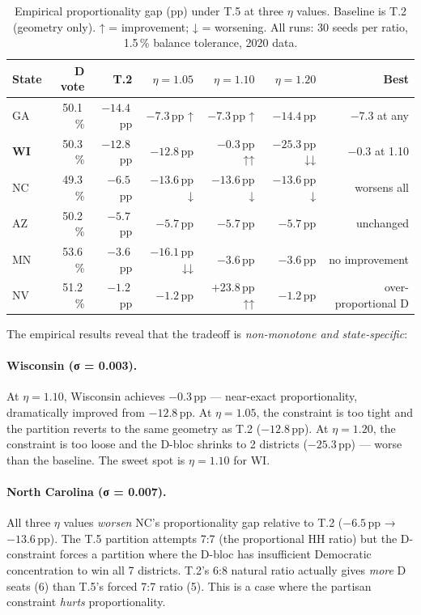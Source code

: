 \begin{table}[h]
\centering
\caption{Empirical proportionality gap (pp) under T.5 at three $\eta$ values.
Baseline is T.2 (geometry only). ↑ = improvement; ↓ = worsening.
All runs: 30 seeds per ratio, 1.5\,\% balance tolerance, 2020 data.}
\label{tab:tradeoff-empirical}
\begin{tabular}{lrrrrrr}
\toprule
State & D vote & T.2 & $\eta=1.05$ & $\eta=1.10$ & $\eta=1.20$ & Best \\
\midrule
GA & 50.1\,\% & $-14.4$\,pp & $-7.3$\,pp \small{↑} & $-7.3$\,pp \small{↑} & $-14.4$\,pp & $-7.3$ at any \\
\textbf{WI} & 50.3\,\% & $-12.8$\,pp & $-12.8$\,pp & $\mathbf{-0.3}$\,pp \small{↑↑} & $-25.3$\,pp \small{↓↓} & $-0.3$ at 1.10 \\
NC & 49.3\,\% & $-6.5$\,pp  & $-13.6$\,pp \small{↓} & $-13.6$\,pp \small{↓} & $-13.6$\,pp \small{↓} & worsens all \\
AZ & 50.2\,\% & $-5.7$\,pp  & $-5.7$\,pp  & $-5.7$\,pp  & $-5.7$\,pp  & unchanged \\
MN & 53.6\,\% & $-3.6$\,pp  & $-16.1$\,pp \small{↓↓} & $-3.6$\,pp & $-3.6$\,pp & no improvement \\
NV & 51.2\,\% & $-1.2$\,pp  & $-1.2$\,pp  & $+23.8$\,pp \small{↑↑} & $-1.2$\,pp  & over-proportional D \\
\bottomrule
\end{tabular}
\end{table}

The empirical results reveal that the tradeoff is \emph{non-monotone and state-specific}:

\paragraph{Wisconsin (σ = 0.003).}
At $\eta = 1.10$, Wisconsin achieves $-0.3$\,pp --- near-exact proportionality,
dramatically improved from $-12.8$\,pp.
At $\eta = 1.05$, the constraint is too tight and the partition reverts to the
same geometry as T.2 ($-12.8$\,pp).
At $\eta = 1.20$, the constraint is too loose and the D-bloc shrinks to
2 districts ($-25.3$\,pp) --- worse than the baseline.
The sweet spot is $\eta = 1.10$ for WI.

\paragraph{North Carolina (σ = 0.007).}
All three $\eta$ values \emph{worsen} NC's proportionality gap relative to T.2
($-6.5$\,pp → $-13.6$\,pp).
The T.5 partition attempts 7:7 (the proportional HH ratio) but the D-constraint
forces a partition where the D-bloc has insufficient Democratic concentration
to win all 7 districts.
T.2's 6:8 natural ratio actually gives \emph{more} D seats (6) than T.5's
forced 7:7 ratio (5).
This is a case where the partisan constraint \emph{hurts} proportionality.

